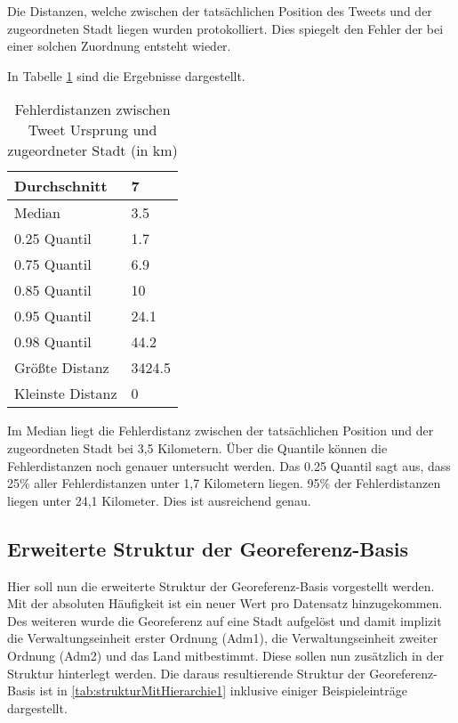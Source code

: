 			Die Distanzen, welche zwischen der tatsächlichen Position des Tweets und der zugeordneten Stadt liegen wurden protokolliert. 
			Dies spiegelt den Fehler der bei einer solchen Zuordnung entsteht wieder.

			In Tabelle \ref{tab:distances} sind die Ergebnisse dargestellt.

			\begin{table}[h]
			\centering
			\caption{Fehlerdistanzen zwischen Tweet Ursprung und zugeordneter Stadt (in km)}
			\label{tab:distances}
			\begin{tabular}{|l|l|}
			Durchschnitt & 7      \\ \hline
			Median       & 3.5    \\ \hline
			0.25 Quantil & 1.7    \\ \hline
			0.75 Quantil & 6.9    \\ \hline
			0.85 Quantil & 10     \\ \hline
			0.95 Quantil & 24.1   \\ \hline
			0.98 Quantil & 44.2   \\ \hline
			Größte Distanz      & 3424.5 \\ \hline
			Kleinste Distanz     & 0     
			\end{tabular}
			\end{table}

			Im Median liegt die Fehlerdistanz zwischen der tatsächlichen Position und der zugeordneten Stadt bei 3,5 Kilometern.
			Über die Quantile können die Fehlerdistanzen noch genauer untersucht werden.
			Das 0.25 Quantil sagt aus, dass 25\% aller Fehlerdistanzen unter 1,7 Kilometern liegen.
			95\% der Fehlerdistanzen liegen unter 24,1 Kilometer. 
			Dies ist ausreichend genau. 

		\subsection{Erweiterte Struktur der Georeferenz-Basis} \label{subsec:erweiterteStruktur} 

			Hier soll nun die erweiterte Struktur der Georeferenz-Basis vorgestellt werden.
			Mit der absoluten Häufigkeit ist ein neuer Wert pro Datensatz hinzugekommen.
			Des weiteren wurde die Georeferenz auf eine Stadt aufgelöst und damit implizit die Verwaltungseinheit erster Ordnung (Adm1), die Verwaltungseinheit zweiter Ordnung (Adm2) und das Land mitbestimmt. 
			Diese sollen nun zusätzlich in der Struktur hinterlegt werden.
			Die daraus resultierende Struktur der Georeferenz-Basis ist in \ref{tab:strukturMitHierarchie1} inklusive einiger Beispieleinträge dargestellt.


